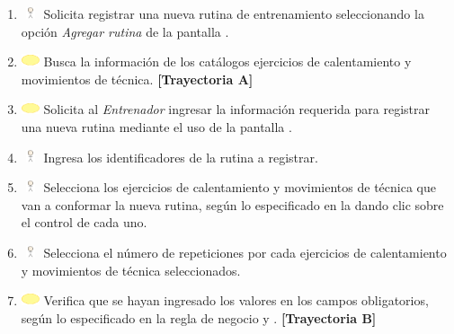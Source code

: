 \begin{enumerate}
	\item \includegraphics[width=15pt, height=10pt]{./Figuras/iconosCU/usuario.png} Solicita registrar una nueva rutina de entrenamiento seleccionando la opción \textit{Agregar rutina} de la pantalla .
	\item \includegraphics[width=15pt]{./Figuras/iconosCU/herramienta.png} Busca la información de los catálogos ejercicios de calentamiento y movimientos de técnica. \textbf{[Trayectoria A]}
	\item \includegraphics[width=15pt]{./Figuras/iconosCU/herramienta.png} Solicita al \textit{Entrenador} ingresar la información requerida para registrar una nueva rutina mediante el uso de la pantalla .
	\item \includegraphics[width=15pt, height=10pt]{./Figuras/iconosCU/usuario.png} Ingresa los identificadores de la rutina a registrar.
	\item \includegraphics[width=15pt, height=10pt]{./Figuras/iconosCU/usuario.png} Selecciona los ejercicios de calentamiento y movimientos de técnica que van a conformar la nueva rutina, según lo especificado en la  dando clic sobre el control de cada uno.
	\item \includegraphics[width=15pt, height=10pt]{./Figuras/iconosCU/usuario.png} Selecciona el número de repeticiones por cada ejercicios de calentamiento y movimientos de técnica seleccionados.
	\item \includegraphics[width=15pt]{./Figuras/iconosCU/herramienta.png} Verifica que se hayan ingresado los valores en los campos obligatorios, según lo especificado en la regla de negocio  y . \textbf{[Trayectoria B]}

\end{enumerate}
